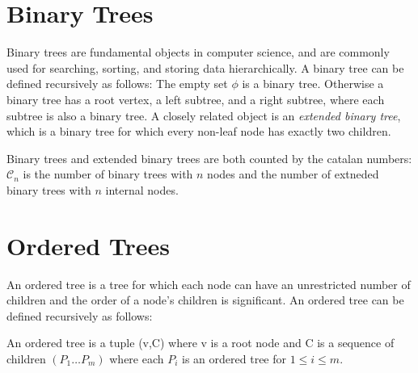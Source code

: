 

\section{Binary Trees}

Binary trees are fundamental objects in computer science, and are commonly used for searching, sorting, and storing data hierarchically. A binary tree can be defined recursively as follows: The empty set $\phi$ is a binary tree. Otherwise a binary tree has a root vertex, a left subtree, and a right subtree, where each subtree is also a binary tree. A closely related object is an \emph{extended binary tree}, which is a binary tree for which every non-leaf node has exactly two children.  

Binary trees and extended binary trees are both counted by the catalan numbers: $\mathcal{C}_n$ is the number of binary trees with $n$ nodes and the number of extneded binary trees with $n$ internal nodes.  


\section{Ordered Trees}

An ordered tree is a tree for which each node can have an unrestricted number of children and the order of a node's children is significant.  An ordered tree can be defined recursively as follows:


An ordered tree is a tuple (v,C) where v is a root node and C is a sequence of children $(P_1\dots P_m)$ where each $P_i$ is an ordered tree for $1 \le i \le m$.

